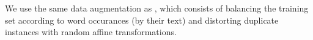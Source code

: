 \documentclass[ms,electronic,twosidetoc,letterpaper,chaptercenter,parttop,lol,lof,lot]{byumsphd}
\begin{document}
We use the same data augmentation as \cite{sudholt2017}, which consists of balancing the training set according to word occurances (by their text) and distorting duplicate instances with random affine transformations.



\end{document}

